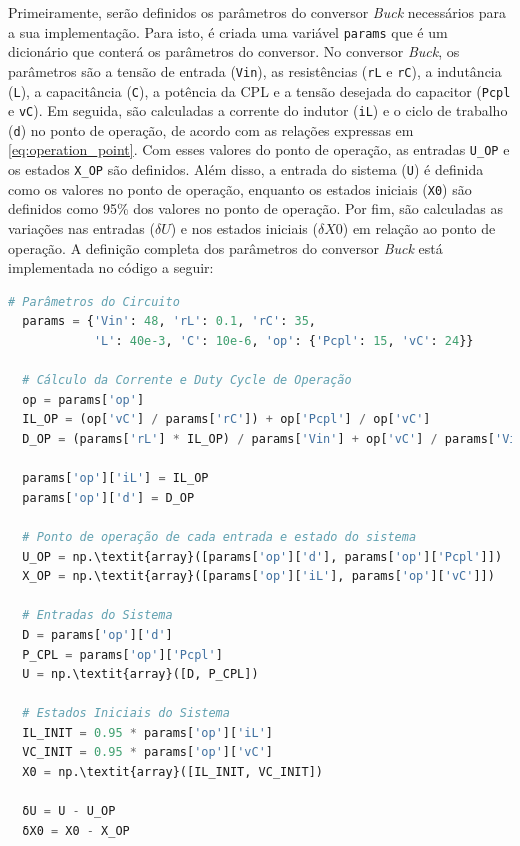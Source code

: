 Primeiramente, serão definidos os parâmetros do conversor \textit{Buck} necessários para a sua implementação. Para isto, é criada uma variável \texttt{params} que é um dicionário que conterá os parâmetros do conversor. No conversor \textit{Buck}, os parâmetros são a tensão de entrada (\texttt{Vin}), as resistências (\texttt{rL} e \texttt{rC}), a indutância (\texttt{L}), a capacitância (\texttt{C}), a potência da CPL e a tensão desejada do capacitor (\texttt{Pcpl} e \texttt{vC}). Em seguida, são calculadas a corrente do indutor (\texttt{iL}) e o ciclo de trabalho (\texttt{d}) no ponto de operação, de acordo com as relações expressas em \eqref{eq:operation_point}. Com esses valores do ponto de operação, as entradas \texttt{U\_OP} e os estados \texttt{X\_OP} são definidos. Além disso, a entrada do sistema (\texttt{U}) é definida como os valores no ponto de operação, enquanto os estados iniciais (\texttt{X0}) são definidos como 95\% dos valores no ponto de operação. Por fim, são calculadas as variações nas entradas (\(\delta U\)) e nos estados iniciais ($\delta X0$) em relação ao ponto de operação. A definição completa dos parâmetros do conversor \textit{Buck} está implementada no código a seguir:

\vspace{8pt}
\begin{lstlisting}[language=Python, caption={Parâmetros do conversor \textit{Buck}.}, label=cod:buck_params]
  # Parâmetros do Circuito
  params = {'Vin': 48, 'rL': 0.1, 'rC': 35,
            'L': 40e-3, 'C': 10e-6, 'op': {'Pcpl': 15, 'vC': 24}}

  # Cálculo da Corrente e Duty Cycle de Operação
  op = params['op']
  IL_OP = (op['vC'] / params['rC']) + op['Pcpl'] / op['vC']
  D_OP = (params['rL'] * IL_OP) / params['Vin'] + op['vC'] / params['Vin']

  params['op']['iL'] = IL_OP
  params['op']['d'] = D_OP

  # Ponto de operação de cada entrada e estado do sistema
  U_OP = np.\textit{array}([params['op']['d'], params['op']['Pcpl']])
  X_OP = np.\textit{array}([params['op']['iL'], params['op']['vC']])

  # Entradas do Sistema
  D = params['op']['d']
  P_CPL = params['op']['Pcpl']
  U = np.\textit{array}([D, P_CPL])

  # Estados Iniciais do Sistema
  IL_INIT = 0.95 * params['op']['iL']
  VC_INIT = 0.95 * params['op']['vC']
  X0 = np.\textit{array}([IL_INIT, VC_INIT])

  δU = U - U_OP
  δX0 = X0 - X_OP
\end{lstlisting}

